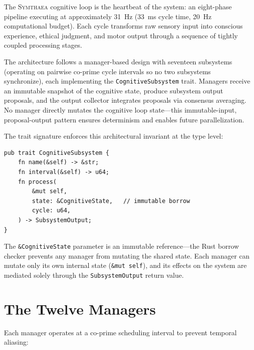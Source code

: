 \documentclass[12pt]{book}
\newcommand{\symthaea}{\textsc{Symthaea}}
\begin{document}
The \symthaea{} cognitive loop is the heartbeat of the system: an eight-phase pipeline executing at approximately 31~Hz (33~ms cycle time, 20~Hz computational budget). Each cycle transforms raw sensory input into conscious experience, ethical judgment, and motor output through a sequence of tightly coupled processing stages.

The architecture follows a manager-based design with seventeen subsystems (operating on pairwise co-prime cycle intervals so no two subsystems synchronize), each implementing the \texttt{CognitiveSubsystem} trait. Managers receive an immutable snapshot of the cognitive state, produce subsystem output proposals, and the output collector integrates proposals via consensus averaging. No manager directly mutates the cognitive loop state---this immutable-input, proposal-output pattern ensures determinism and enables future parallelization.

The trait signature enforces this architectural invariant at the type level:

\begin{lstlisting}[caption={The CognitiveSubsystem trait enforces immutable access.},label=lst:cognitive-subsystem]
pub trait CognitiveSubsystem {
    fn name(&self) -> &str;
    fn interval(&self) -> u64;
    fn process(
        &mut self,
        state: &CognitiveState,   // immutable borrow
        cycle: u64,
    ) -> SubsystemOutput;
}
\end{lstlisting}

The \texttt{\&CognitiveState} parameter is an immutable reference---the Rust borrow checker prevents any manager from mutating the shared state. Each manager can mutate only its own internal state (\texttt{\&mut self}), and its effects on the system are mediated solely through the \texttt{SubsystemOutput} return value.

\section{The Twelve Managers}

Each manager operates at a co-prime scheduling interval to prevent temporal aliasing:
\end{document}
